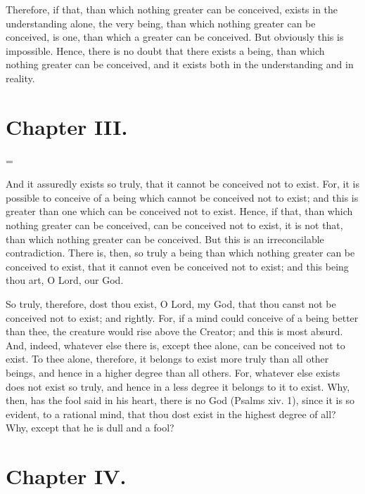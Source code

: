 Therefore, if that, than which nothing greater can be conceived,
exists in the understanding alone, the very being, than which nothing
greater can be conceived, is one, than which a greater can be
conceived. But obviously this is impossible. Hence, there is no doubt
that there exists a being, than which nothing greater can be
conceived, and it exists both in the understanding and in reality.

\section*{Chapter III.}

\hangindent=\parindent
{}

\vspace{1\baselineskip}

And it assuredly exists so truly, that it cannot be conceived not to
exist. For, it is possible to conceive of a being which cannot be
conceived not to exist; and this is greater than one which can be
conceived not to exist. Hence, if that, than which nothing greater can
be conceived, can be conceived not to exist, it is not that, than
which nothing greater can be conceived. But this is an irreconcilable
contradiction. There is, then, so truly a being than which nothing
greater can be conceived to exist, that it cannot even  be
conceived not to exist; and this being thou art, O Lord, our God.

So truly, therefore, dost thou exist, O Lord, my God, that thou canst
not be conceived not to exist; and rightly. For, if a mind could
conceive of a being better than thee, the creature would rise above
the Creator; and this is most absurd. And, indeed, whatever else there
is, except thee alone, can be conceived not to exist. To thee alone,
therefore, it belongs to exist more truly than all other beings, and
hence in a higher degree than all others. For, whatever else exists
does not exist so truly, and hence in a less degree it belongs to it
to exist. Why, then, has the fool said in his heart, there is no God
(Psalms xiv. 1), since it is so evident, to a rational mind, that thou
dost exist in the highest degree of all? Why, except that he is dull
and a fool?

\section*{Chapter IV.}

